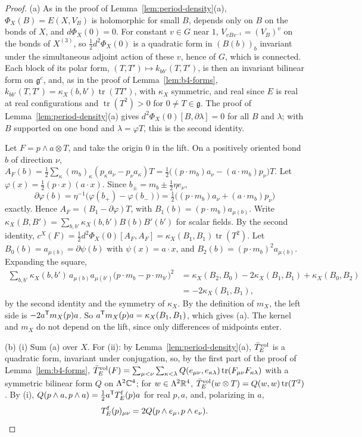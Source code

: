 \begin{proof}
(a) As in the proof of Lemma~\ref{lem:period-density}(a), $\Phi_X(B)=E(X,V_B)$ is holomorphic for small $B$, depends only on $B$ on the bonds of $X$, and $d\Phi_X(0)=0$. For constant $v\in G$ near $1$, $V_{vBv^{-1}}=(V_B)^v$ on the bonds of $X^{(3)}$, so $\frac12d^2\Phi_X(0)$ is a quadratic form in $(B(b))_b$ invariant under the simultaneous adjoint action of these $v$, hence of $G$, which is connected. Each block of its polar form, $(T,T')\mapsto k_{bb'}(T,T')$, is then an invariant bilinear form on $\mathfrak g^c$, and, as in the proof of Lemma~\ref{lem:b4-forms}, $k_{bb'}(T,T')=\kappa_X(b,b')\operatorname{tr}(TT')$, with $\kappa_X$ symmetric, and real since $E$ is real at real configurations and $\operatorname{tr}(T^2)>0$ for $0\ne T\in\mathfrak g$. The proof of Lemma~\ref{lem:period-density}(a) gives $d^2\Phi_X(0)[B,\partial\lambda]=0$ for all $B$ and $\lambda$; with $B$ supported on one bond and $\lambda=\varphi T$, this is the second identity.

Let $F=p\wedge a\otimes T$, and take the origin $0$ in the lift. On a positively oriented bond $b$ of direction $\nu$, $A_F(b)=\frac12\sum_\kappa(m_b)_\kappa(p_\kappa a_\nu-p_\nu a_\kappa)T=\frac12\big((p\cdot m_b)a_\nu-(a\cdot m_b)p_\nu\big)T$. Let $\varphi(x)=\frac12(p\cdot x)(a\cdot x)$. Since $b_\pm=m_b\pm\frac12\eta e_\nu$,
\[
\partial\varphi(b)=\eta^{-1}\big(\varphi(b_+)-\varphi(b_-)\big)=\tfrac12\big((p\cdot m_b)a_\nu+(a\cdot m_b)p_\nu\big)
\]
exactly. Hence $A_F=(B_1-\partial\varphi)T$, with $B_1(b)=(p\cdot m_b)a_{\mu(b)}$. Write $\kappa_X(B,B')=\sum_{b,b'}\kappa_X(b,b')B(b)B'(b')$ for scalar fields. By the second identity, $c^X(F)=\frac12d^2\Phi_X(0)[A_F,A_F]=\kappa_X(B_1,B_1)\operatorname{tr}(T^2)$. Let $B_0(b)=a_{\mu(b)}=\partial\psi(b)$ with $\psi(x)=a\cdot x$, and $B_2(b)=(p\cdot m_b)^2a_{\mu(b)}$. Expanding the square,
\[
\begin{aligned}
\sum_{b,b'}\kappa_X(b,b')\,a_{\mu(b)}a_{\mu(b')}\big(p\cdot m_b-p\cdot m_{b'}\big)^2&=\kappa_X(B_2,B_0)-2\kappa_X(B_1,B_1)+\kappa_X(B_0,B_2)\\
&=-2\kappa_X(B_1,B_1),
\end{aligned}
\]
by the second identity and the symmetry of $\kappa_X$. By the definition of $m_X$, the left side is $-2a^{\sf T}m_X(p)a$. So $a^{\sf T}m_X(p)a=\kappa_X(B_1,B_1)$, which gives (a). The kernel and $m_X$ do not depend on the lift, since only differences of midpoints enter.

(b) (i) Sum (a) over $X$. For (ii): by Lemma~\ref{lem:period-density}(a), $\bar T^{\rm vol}_E$ is a quadratic form, invariant under conjugation, so, by the first part of the proof of Lemma~\ref{lem:b4-forms}, $\bar T^{\rm vol}_E(F)=\sum_{\mu<\nu}\sum_{\kappa<\lambda}Q(e_{\mu\nu},e_{\kappa\lambda})\operatorname{tr}(F_{\mu\nu}F_{\kappa\lambda})$ with a symmetric bilinear form $Q$ on $\Lambda^2\mathbb C^4$; for $w\in\Lambda^2\mathbb R^4$, $\bar T^{\rm vol}_E(w\otimes T)=Q(w,w)\operatorname{tr}(T^2)$. By (i), $Q(p\wedge a,p\wedge a)=\frac12a^{\sf T}T^{\rm f}_E(p)a$ for real $p,a$, and, polarizing in $a$,
\begin{equation}\label{eq:Tf-Q}
T^{\rm f}_E(p)_{\mu\nu}=2Q(p\wedge e_\mu,p\wedge e_\nu).
\end{equation}


\end{proof}
